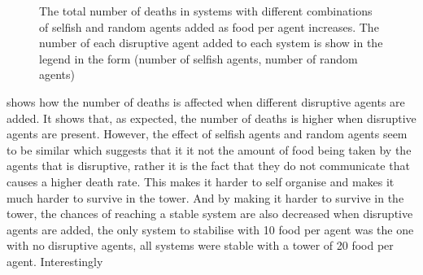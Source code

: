 \begin{figure}[H] %
    \centering
    \caption{The total number of deaths in systems with different combinations of selfish and random agents added as food per agent increases. The number of each disruptive agent added to each system is show in the legend in the form (number of selfish agents, number of random agents)}
    \label{fig:team1-robustness-food-scarcity-disruptive-agents}
\end{figure}

 shows how the number of deaths is affected when different disruptive agents are added. It shows that, as expected, the number of deaths is higher when disruptive agents are present. However, the effect of selfish agents and random agents seem to be similar which suggests that it it not the amount of food being taken by the agents that is disruptive, rather it is the fact that they do not communicate that causes a higher death rate. This makes it harder to self organise and makes it much harder to survive in the tower. 
And by making it harder to survive in the tower, the chances of reaching a stable system are also decreased when disruptive agents are added, the only system to stabilise with 10 food per agent was the one with no disruptive agents, all systems were stable with a tower of 20 food per agent.
Interestingly
